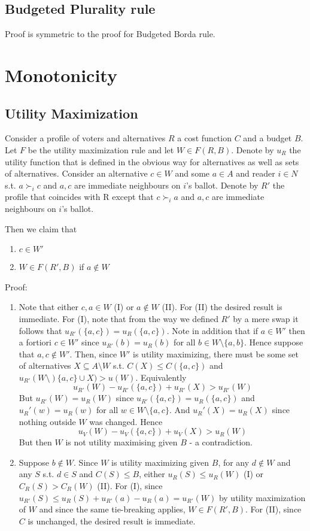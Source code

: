 \documentclass{article}
\begin{document}
\subsection{Budgeted Plurality rule}
Proof is symmetric to the proof for Budgeted Borda rule. 
\section{Monotonicity}

\subsection{Utility Maximization}

Consider a profile of voters and alternatives $R$ a cost function $C$ and a budget $B$. Let $F$ be the utility maximization rule and let $W\in F(R,B)$. Denote by $u_R$ the utility function that is defined in the obvious way for alternatives as well as sets of alternatives. Consider an alternative $c\in W$ and some $a\in A$ and reader $i\in N$  s.t. $a\succ_i c$ and $a,c$ are immediate neighbours on $i$'s ballot. Denote by $R'$ the profile that coincides with R except that $c\succ_i a$ and $a,c$ are immediate neighbours on $i$'s ballot.

Then we claim that
\begin{enumerate}
\item $c\in W'$
\item $W\in F(R',B)$ if $a\notin W$
\end{enumerate}
Proof:

\begin{enumerate}
\item Note that either $c,a \in W$ (I) or $a\notin W$ (II). For (II) the desired result is immediate. For (I), note that from the way we defined $R'$ by a mere swap it follows that $u_{R'}(\{a,c\})=u_R(\{a,c\})$. Note in addition that if $a\in W'$ then a fortiori $c\in W'$ since $u_{R'}(b)=u_R(b)$ for all $b\in W\setminus \{a,b\}$. Hence suppose that $a,c\notin W'$. Then, since $W'$ is utility maximizing, there must be some set of alternatives $X\subseteq A\setminus W$ s.t. $C(X)\leq C(\{a,c\})$ and $u_{R'}(W\setminus)\{a,c\}\cup X)>u(W)$. Equivalently \[u_{R'}(W)-u_{R'}(\{a,c\})+u_{R'}(X)>u_{R'}(W)\] But $u_{R'}(W)=u_{R}(W)$ since $u_{R'}(\{a,c\})=u_R(\{a,c\})$ and $u_R'(w)=u_R(w)$ for all $w\in W\setminus \{a,c\}$. And $u_R'(X)=u_R(X)$ since nothing outside $W$ was changed. Hence \[u_V(W)-u_V(\{a,c\})+u_V(X)>u_R(W)\] But then $W$ is not utility maximising given $B$ - a contradiction.

\item Suppose $b\notin W$. Since $W$ is utility maximizing given $B$, for any $d\notin W$ and any $S$ s.t. $d\in S$ and $C(S)\leq  B$, either $u_R(S)\leq u_R(W)$ (I) or $C_R(S)>C_R(W)$ (II). For (I), since $u_{R'}(S) \leq  u_{R}(S)+ u_{R'}(a)- u_{R}(a)= u_{R'}(W)$ by utility maximization of $W$ and since the same tie-breaking applies, $W\in F(R',B)$. For (II), since $C$ is unchanged, the desired result is immediate.

\end{enumerate}
\end{document}
